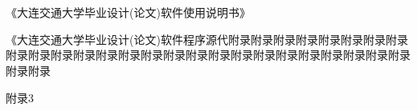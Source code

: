 

 \clearpage



 \chapter*{} 



\begin{description}\itemsep0.75pt
	\item [附录一:] 
	《大连交通大学毕业设计(论文)软件使用说明书》
	
	\item[附录二:] 
	《大连交通大学毕业设计(论文)软件程序源代附录附录附录附录附录附录附录附录附录附录附录附录附录附录附录附录附录附录附录附录附录附录附录附录附录附录附录附录
	
	\item[附录三:] 
	附录3
\end{description}



